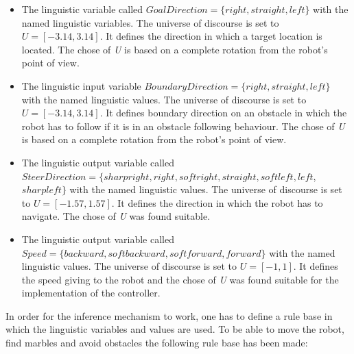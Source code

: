 \documentclass[../Head/Main.tex]{subfiles}
\begin{document}
\begin{itemize}
\item The linguistic variable called $GoalDirection = \{right, straight, left\}$ with the named linguistic variables. The universe of discourse is set to ${U} = [-3.14, 3.14]$. It defines the direction in which a target location is located. The chose of \textit{U} is based on a complete rotation from the robot's point of view. 
\item The linguistic input variable $BoundaryDirection = \{right, straight, left\}$ with the named linguistic values. The universe of discourse is set to ${U} = [-3.14, 3.14]$. It defines boundary direction on an obstacle in which the robot has to follow if it is in an obstacle following behaviour. The chose of \textit{U} is based on a complete rotation from the robot's point of view. 
\item The linguistic output variable called $SteerDirection = \{sharpright, right, softright, straight, softleft, left$, $sharpleft\}$ with the named linguistic values. The universe of discourse is set to ${U} = [-1.57, 1.57]$. It defines the direction in which the robot has to navigate. The chose of \textit{U} was found suitable.
\item The linguistic output variable called $Speed = \{backward, softbackward, softforward, forward\}$ with the named linguistic values. The universe of discourse is set to ${U} = [-1, 1]$. It defines the speed giving to the robot and the chose of \textit{U} was found suitable for the implementation of the controller.      
      
\end{itemize}

In order for the inference mechanism to work, one has to define a rule base in which the linguistic variables and values are used. To be able to move the robot, find marbles and avoid obstacles the following rule base has been made:  
\end{document}
